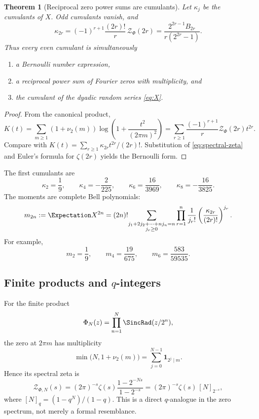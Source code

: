 \documentclass[11pt,oneside]{article}
\newtheorem{theorem}{Theorem}[section]
\theoremstyle{definition}
\theoremstyle{remark}
\begin{document}
\begin{theorem}[Reciprocal zero power sums are cumulants]
\label{thm:cumulants}
Let \(\kappa_j\) be the cumulants of \(X\).  Odd cumulants vanish, and
\begin{equation}
 \boxed{\displaystyle
 \kappa_{2r}
 =(-1)^{r+1}\frac{(2r)!}{r}\,
  \mathcal Z_\Phi(2r)
 =\frac{2^{2r-1}B_{2r}}{r(2^{2r}-1)}.}
 \label{eq:cumulants}
\end{equation}
Thus every even cumulant is simultaneously
\begin{enumerate}[label=(\roman*),leftmargin=2.5em]
\item a Bernoulli number expression,
\item a reciprocal power sum of Fourier zeros with multiplicity, and
\item the cumulant of the dyadic random series \eqref{eq:X}.
\end{enumerate}
\end{theorem}

\begin{proof}
From the canonical product,
\[
 K(t)
 =\sum_{m\geq1}(1+\nu_2(m))
  \log\!\left(1+\frac{t^2}{(2\pi m)^2}\right)
 =\sum_{r\geq1}\frac{(-1)^{r+1}}r
   \mathcal Z_\Phi(2r)t^{2r}.
\]
Compare with
\(K(t)=\sum_{r\geq1}\kappa_{2r}t^{2r}/(2r)!\).
Substitution of \eqref{eq:spectral-zeta} and Euler's formula for
\(\zeta(2r)\) yields the Bernoulli form.
\end{proof}

The first cumulants are
\[
 \kappa_2=\frac19,\qquad
 \kappa_4=-\frac2{225},\qquad
 \kappa_6=\frac{16}{3969},\qquad
 \kappa_8=-\frac{16}{3825}.
\]
The moments are complete Bell polynomials:
\begin{equation}
 m_{2n}:=\Expectation X^{2n}
 =(2n)!\!
 \sum_{\substack{j_1+2j_2+\cdots+nj_n=n\\j_r\geq0}}
 \prod_{r=1}^{n}
 \frac1{j_r!}
 \left(\frac{\kappa_{2r}}{(2r)!}\right)^{j_r}.
 \label{eq:moment-bell}
\end{equation}
For example,
\[
 m_2=\frac19,\qquad
 m_4=\frac{19}{675},\qquad
 m_6=\frac{583}{59535}.
\]

\subsection{Finite products and \(q\)-integers}

For the finite product
\[
 \Phi_N(z)=\prod_{n=1}^{N}\SincRad(z/2^n),
\]
the zero at \(2\pi m\) has multiplicity
\[
 \min\!\bigl(N,1+\nu_2(m)\bigr)
 =\sum_{j=0}^{N-1}\mathbf1_{2^j\mid m}.
\]
Hence its spectral zeta is
\begin{equation}
 \mathcal Z_{\Phi,N}(s)
 =(2\pi)^{-s}\zeta(s)
   \frac{1-2^{-Ns}}{1-2^{-s}}
 =(2\pi)^{-s}\zeta(s)\,[N]_{2^{-s}},
 \label{eq:finite-qinteger}
\end{equation}
where \([N]_q=(1-q^N)/(1-q)\).  This is a direct \(q\)-analogue in the
zero spectrum, not merely a formal resemblance.
\end{document}
